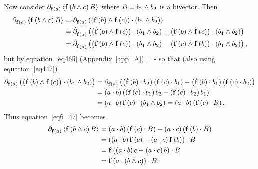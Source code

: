 Now consider  $\partial_{\f{\fbld}{a}}\grd{\f{\fbld}{b\W c}B}{}$ where $B=b_{1}\W b_{2}$ is a bivector.  Then
\begin{align}
	\partial_{\f{\fbld}{a}}\grd{\f{\fbld}{b\W c}B}{} &= \partial_{\f{\fbld}{a}}\paren{\paren{\f{\fbld}{b}\W\f{\fbld}{c}}\cdot\paren{b_{1}\W b_{2}}} \nonumber \\
	        &= \dot{\partial}_{\f{\dot{\fbld}}{a}}\paren{\paren{\f{\dot{\fbld}}{b}\W\f{\fbld}{c}}\cdot\paren{b_{1}\W b_{2}}+
	           \paren{\f{\fbld}{b}\W\f{\dot{\fbld}}{c}}\cdot\paren{b_{1}\W b_{2}}} \nonumber \\
	        &= \dot{\partial}_{\f{\dot{\fbld}}{a}}\paren{\paren{\f{\dot{\fbld}}{b}\W\f{\fbld}{c}}\cdot\paren{b_{1}\W b_{2}}-
	           \paren{\f{\dot{\fbld}}{c}\W\f{\fbld}{b}}\cdot\paren{b_{1}\W b_{2}}},\label{eq6_47}
\end{align}
but by equation~\ref{eq465} (Appendix~\ref{app_A})
\be
	\cdot{} = -
\ee
so that (also using equation~\ref{eq447})
\begin{align}
	\dot{\partial}_{\f{\fbld}{a}}\paren{\paren{\f{\dot{\fbld}}{b}\W\f{\fbld}{c}}\cdot\paren{b_{1}\W b_{2}} }
	     &= \dot{\partial}_{\f{\fbld}{a}}\paren{\paren{\f{\dot{\fbld}}{b}\cdot b_{2}}\paren{\f{\fbld}{c}\cdot b_{1}}-
	                                                               \paren{\f{\dot{\fbld}}{b}\cdot b_{1}}\paren{\f{\fbld}{c}\cdot b_{2}}}\nonumber \\
         &= \paren{a\cdot b}\paren{\paren{\f{\fbld}{c}\cdot b_{1}}b_{2}-\paren{\f{\fbld}{c}\cdot b_{2}}b_{1}} \nonumber \\
         &= \paren{a\cdot b}\f{\fbld}{c}\cdot\paren{b_{1}\W b_{2}} = \paren{a\cdot b}\paren{\f{\fbld}{c}\cdot B}.
\end{align}
Thus equation~\ref{eq6_47} becomes
\begin{align}
	\partial_{\f{\fbld}{a}}\grd{\f{\fbld}{b\W c}B}{} &= \paren{a\cdot b}\paren{\f{\fbld}{c}\cdot B}-\paren{a\cdot c}\paren{\f{\fbld}{b}\cdot B} \nonumber \\
	                                                 &= \paren{\paren{a\cdot b}\f{\fbld}{c}-\paren{a\cdot c}\f{\fbld}{b}}\cdot B \nonumber \\
	                                                 &= \f{\fbld}{\paren{a\cdot b}c-\paren{a\cdot c}b}\cdot B \nonumber \\
	                                                 &= \f{\fbld}{a\cdot\paren{b\W c}}\cdot B.
\end{align}
